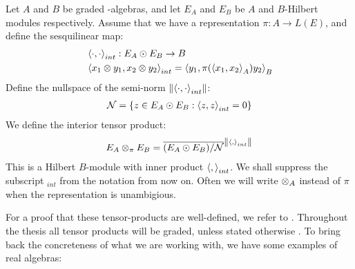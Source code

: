 \begin{definition}
	Let $A$ and $B$ be graded \Cstar-algebras, and let $E_A$ and $E_B$ be $A$ and $B$-Hilbert modules respectively. Assume that we have a representation $\pi: A\to L(E)$, and define the sesquilinear map: 
	\begin{align*}
		&\left \langle \cdot,\cdot \right \rangle_{int}: E_A\odot E_B \to B \\
		&\left \langle x_1\otimes y_1,x_2\otimes y_2 \right \rangle_{int}=\left \langle y_1,\pi(\left \langle x_1,x_2 \right \rangle_A)y_2 \right \rangle_B
	\end{align*}
	Define the nullspace of the semi-norm $\left \Vert \left \langle \cdot,\cdot \right \rangle_{int} \right \Vert$:
	\begin{align*}
		\mathcal{N}=\{z\in E_A\odot E_B : \left \langle z,z \right \rangle_{int}=0\}
	\end{align*}
	We define the interior tensor product:
	\begin{align*}
		E_A\otimes_{\pi} E_B=\overline{(E_A\odot E_B)/\mathcal{N}}^{\left \Vert \left \langle , \right \rangle_{int} \right \Vert}
	\end{align*}
	This is a Hilbert $B$-module with inner product $\left \langle , \right \rangle_{int}$. We shall suppress the subscript ${}_{int}$ from the notation from now on. Often we will write $\otimes_A$ instead of $\pi$ when the representation is unambigious.
\end{definition}
For a proof that these tensor-products are well-defined, we refer to \cite{lance95}. Throughout the thesis all tensor products will be graded, unless stated otherwise . 
To bring back the concreteness of what we are working with, we have some examples of real \Cstar algebras: 
